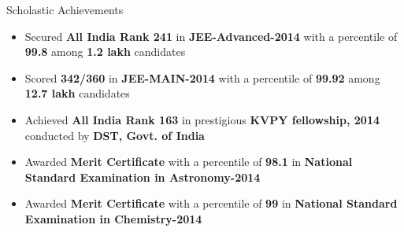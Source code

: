 \documentclass{resume}
\newcommand{\sepval}{-0.5em}
\begin{document}

\vspace{3.5cm}

\renewcommand\labelitemi{\raisebox{0.45ex}{\tiny$\bullet$}}

\begin{rSection}{Scholastic Achievements}

\begin{itemize}[leftmargin=*]
	
	\itemsep \sepval

	
	\item Secured {\bf All India Rank 241} in {\bf JEE-Advanced-2014} with a percentile of {\bf 99.8} among {\bf 1.2 lakh} candidates

	\item Scored {\bf 342/360} in {\bf JEE-MAIN-2014} with a  percentile of {\bf 99.92} among {\bf 12.7 lakh} candidates
	
	\item Achieved {\bf All India Rank 163} in prestigious {\bf KVPY fellowship, 2014} conducted by {\bf DST, Govt. of India}

	\item Awarded {\bf Merit Certificate} with a percentile of {\bf 98.1} in {\bf National Standard Examination in Astronomy-2014}

	\item Awarded {\bf Merit Certificate} with a percentile of {\bf 99} in {\bf National Standard Examination in Chemistry-2014}
	
	
\end{itemize}

\end{rSection}
\end{document}
